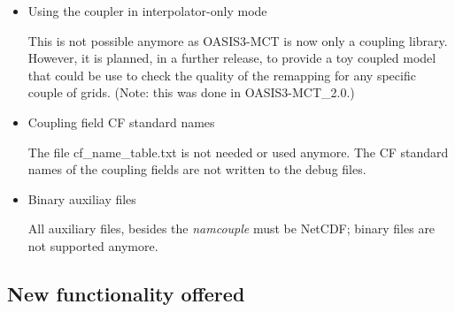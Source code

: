 \begin{itemize}
\begin{itemize}
\item {\tt MASK} and {\tt EXTRAP} are not available but the corresponding
linear extrapolation can be replaced by the more efficient option
using the nearest non-masked source neighbour for target points having
their original neighbours all masked. This is now the default option for {\tt SCRIPR/}{\tt DISTWGT}, {\tt GAUSWGT} and {\tt BILINEAR} interpolations. It is
also included in  if {\tt FRACNNEI}
normalization option is chosen (see section \ref{subsec_interp}).

\item {\tt INTERP} interpolations are not available; {\tt SCRIPR}
  should be used instead.

\item {\tt MOZAIC} is not available as {\tt MAPPING} should be used
  instead.

\item{\tt NOINTERP} does not need to be specified anymore if no
  interpolation is required.

\item Field combination with {\tt BLASOLD} and {\tt BLASNEW}; these
  transformations only support multiplication and addition terms to
the fields (see section \ref{subsec_preproc}).

\end{itemize}

\item Using the coupler in interpolator-only mode

This is not possible anymore as OASIS3-MCT is now only a coupling
library. However, it is planned, in a further release, to provide a
toy coupled model that could be use to check the quality of the
remapping for any specific couple of grids. (Note: this was done in OASIS3-MCT\_2.0.)

\item Coupling field CF standard names

The file cf\_name\_table.txt is not needed or used anymore. The CF
  standard names of the coupling fields are not written to the debug
  files.

\item Binary auxiliay files

All auxiliary files, besides the {\it namcouple} must be NetCDF;
  binary files are not supported anymore.
\end{itemize}

\subsection{New functionality offered}
\label{sec_changes_new}

